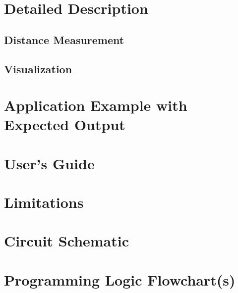 \documentclass[12pt, letterpaper]{article}
\begin{document}
\section{Detailed Description}
\subsection{Distance Measurement}
\subsection{Visualization}
\section{Application Example with Expected Output}
\section{User's Guide}
\section{Limitations}
\section{Circuit Schematic}
\section{Programming Logic Flowchart(s)}
\end{document}
